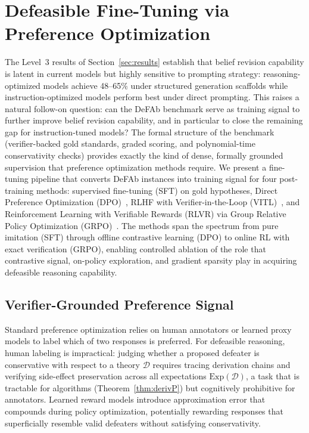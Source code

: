 \documentclass{article}
\theoremstyle{definition}
\newcommand{\D}{\mathcal{D}}
\newcommand{\Exp}{\mathrm{Exp}}
\begin{document}
\section{Defeasible Fine-Tuning via Preference Optimization}\label{sec:finetuning}

The Level~3 results of Section~\ref{sec:results} establish that belief revision capability is latent in current models but highly sensitive to prompting strategy: reasoning-optimized models achieve 48--65\% under structured generation scaffolds while instruction-optimized models perform best under direct prompting. This raises a natural follow-on question: can the DeFAb benchmark serve as training signal to further improve belief revision capability, and in particular to close the remaining gap for instruction-tuned models? The formal structure of the benchmark (verifier-backed gold standards, graded scoring, and polynomial-time conservativity checks) provides exactly the kind of dense, formally grounded supervision that preference optimization methods require. We present a fine-tuning pipeline that converts DeFAb instances into training signal for four post-training methods: supervised fine-tuning (SFT) on gold hypotheses, Direct Preference Optimization (DPO)~\cite{rafailov2023direct}, RLHF with Verifier-in-the-Loop (VITL)~\cite{ouyang2022training}, and Reinforcement Learning with Verifiable Rewards (RLVR) via Group Relative Policy Optimization (GRPO)~\cite{shao2024deepseekmath}.  The methods span the spectrum from pure imitation (SFT) through offline contrastive learning (DPO) to online RL with exact verification (GRPO), enabling controlled ablation of the role that contrastive signal, on-policy exploration, and gradient sparsity play in acquiring defeasible reasoning capability.


\subsection{Verifier-Grounded Preference Signal}\label{subsec:verifier_signal}

Standard preference optimization relies on human annotators or learned proxy models to label which of two responses is preferred. For defeasible reasoning, human labeling is impractical: judging whether a proposed defeater is conservative with respect to a theory $\D$ requires tracing derivation chains and verifying side-effect preservation across all expectations $\Exp(\D)$, a task that is tractable for algorithms (Theorem~\ref{thm:derivP}) but cognitively prohibitive for annotators. Learned reward models introduce approximation error that compounds during policy optimization, potentially rewarding responses that superficially resemble valid defeaters without satisfying conservativity.
\end{document}
